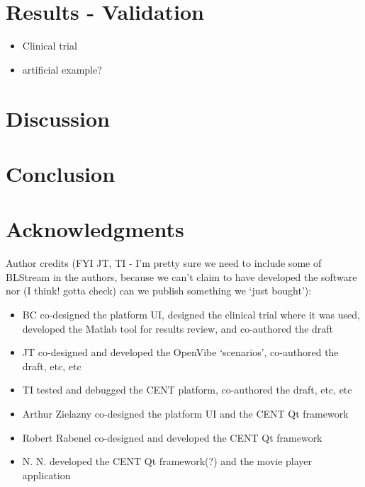 \documentclass[fleqn,10pt]{wlpeerj}
\begin{document}
\section{Results - Validation}

\begin{itemize}
	\item Clinical trial
	
	\item artificial example?
	
\end{itemize}


\section{Discussion}

\lipsum[10] %



\section{Conclusion}

\lipsum[11] %



\section*{Acknowledgments}

Author credits (FYI JT, TI - I’m pretty sure we need to include some of BLStream in the authors, because we can’t claim to have developed the software nor (I think! gotta check) can we publish something we ‘just bought’):
\begin{itemize}
	\item BC co-designed the platform UI, designed the clinical trial where it was used, developed the Matlab tool for results review, and co-authored the draft
	\item JT co-designed and developed the OpenVibe ‘scenarios’, co-authored the draft, etc, etc
	\item TI tested and debugged the CENT platform, co-authored the draft, etc, etc
	\item Arthur Zielazny co-designed the platform UI and the CENT Qt framework
	\item Robert Rabenel co-designed and developed the CENT Qt framework
	\item N. N. developed the CENT Qt framework(?) and the movie player application
\end{itemize}
\end{document}
